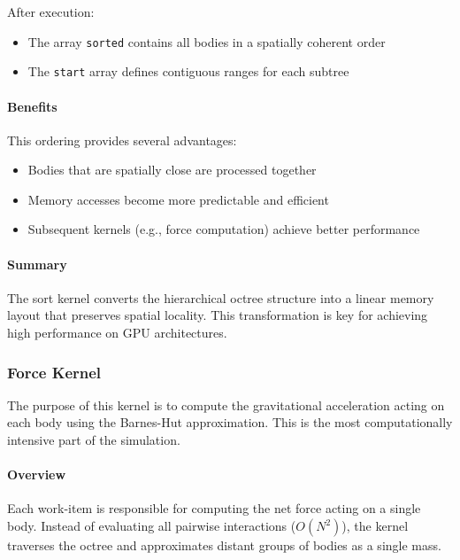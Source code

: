 \documentclass[12pt]{article}
\begin{document}
After execution:

\begin{itemize}
    \item The array \texttt{sorted} contains all bodies in a spatially coherent order
    \item The \texttt{start} array defines contiguous ranges for each subtree
\end{itemize}

\paragraph{Benefits}

This ordering provides several advantages:

\begin{itemize}
    \item Bodies that are spatially close are processed together
    \item Memory accesses become more predictable and efficient
    \item Subsequent kernels (e.g., force computation) achieve better performance
\end{itemize}

\paragraph{Summary}

The sort kernel converts the hierarchical octree structure into a linear memory layout
that preserves spatial locality. This transformation is key for achieving high performance
on GPU architectures.

\subsubsection{Force Kernel}

The purpose of this kernel is to compute the gravitational acceleration acting on each body
using the Barnes-Hut approximation. This is the most computationally intensive part of the simulation.

\paragraph{Overview}

Each work-item is responsible for computing the net force acting on a single body.
Instead of evaluating all pairwise interactions (\(O(N^2)\)), the kernel traverses the octree
and approximates distant groups of bodies as a single mass.
\end{document}
